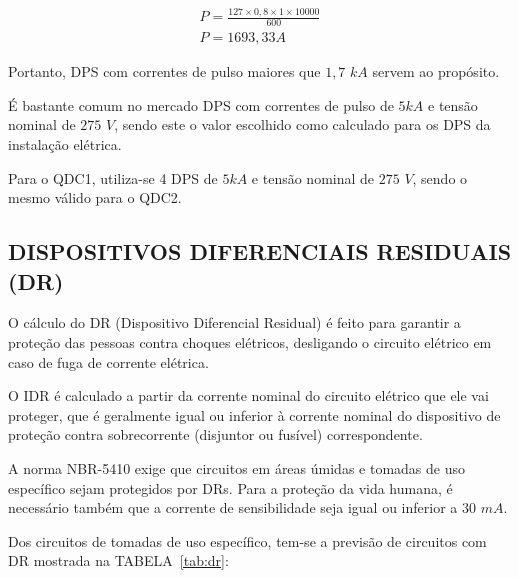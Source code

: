 \begin{equation}
	\begin{split}
		P = \frac{127 \times 0,8 \times 1 \times 10000}{600} \\
		P = 1693,33 A
	\end{split}
\end{equation}

Portanto, DPS com correntes de pulso maiores que $1,7$ $kA$ servem ao propósito.

É bastante comum no mercado DPS com correntes de pulso de $5kA$ e tensão nominal de $275$ $V$, sendo este o valor escolhido como calculado para os DPS da instalação elétrica.

Para o QDC1, utiliza-se 4 DPS de $5kA$ e tensão nominal de $275$ $V$, sendo o mesmo válido para o QDC2.

\subsection{DISPOSITIVOS DIFERENCIAIS RESIDUAIS (DR)}

O cálculo do DR (Dispositivo Diferencial Residual) é feito para garantir a proteção das pessoas contra choques elétricos, desligando o circuito elétrico em caso de fuga de corrente elétrica.

O IDR é calculado a partir da corrente nominal do circuito elétrico que ele vai proteger, que é geralmente igual ou inferior à corrente nominal do dispositivo de proteção contra sobrecorrente (disjuntor ou fusível) correspondente.

A norma NBR-5410 exige que circuitos em áreas úmidas e tomadas de uso específico sejam protegidos por DRs. Para a proteção da vida humana, é necessário também que a corrente de sensibilidade seja igual ou inferior a $30$ $mA$.


Dos circuitos de tomadas de uso específico, tem-se a previsão de circuitos com DR mostrada na TABELA~\ref{tab:dr}:

